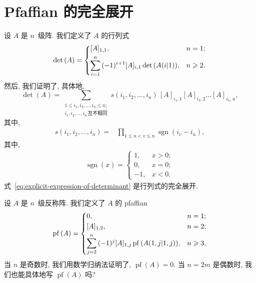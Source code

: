 \documentclass[../libro]{subfiles}
\begin{document}
\section{Pfaffian 的完全展开}

设 \(A\) 是 \(n\)~级阵.
我们定义了 \(A\) 的行列式
\begin{align*}
    \det {(A)}
    =
    \begin{dcases}
        [A]_{1,1},
         & n = 1;    \\
        \sum_{i = 1}^{n}
        {(-1)^{i+1} [A]_{i,1} \det {(A(i|1))}},
         & n \geq 2.
    \end{dcases}
\end{align*}
然后, 我们证明了, 具体地,
\begin{equation}
    \det {(A)}
    =
    \sum_{\substack{
            1 \leq i_1, i_2, \dots, i_n \leq n; \\
            i_1, i_2, \dots, i_n\,\text{互不相同}
        }}
    {s(i_1, i_2, \dots, i_n)\,
        [A]_{i_1,1} [A]_{i_2,2} \dots [A]_{i_n,n}},
    \label{eq:explicit-expression-of-determinant}
\end{equation}
其中,
\begin{align*}
    s(i_1, i_2, \dots, i_n)
    = {} & \prod_{1 \leq u < v \leq n}
    {\operatorname{sgn} {(i_v - i_u)}},
\end{align*}
其中,
\begin{align*}
    \operatorname{sgn} {(x)}
    =
    \begin{cases}
        1,  & x > 0; \\
        0,  & x = 0; \\
        -1, & x < 0.
    \end{cases}
\end{align*}
式~\eqref{eq:explicit-expression-of-determinant}
是行列式的完全展开.

设 \(A\) 是 \(n\)~级反称阵.
我们定义了 \(A\) 的 pfaffian
\begin{align*}
    \operatorname{pf} {(A)} =
    \begin{dcases}
        0,
         & n = 1;    \\
        [A]_{1,2},
         & n = 2;    \\
        \sum_{j = 2}^{n}
        {(-1)^{j} [A]_{1,j}
        \operatorname{pf} {(A({1,j}|{1,j}))}},
         & n \geq 3.
    \end{dcases}
\end{align*}
当 \(n\) 是奇数时,
我们用数学归纳法证明了,
\(\operatorname{pf} {(A)} = 0\).
当 \(n = 2m\) 是偶数时,
我们也能具体地写 \(\operatorname{pf} {(A)}\) 吗?
\end{document}

